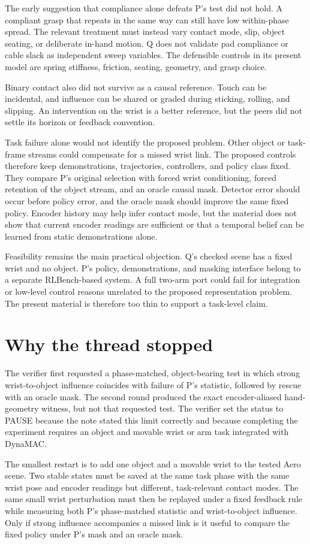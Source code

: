 \documentclass{article}
\begin{document}
The early suggestion that compliance alone defeats P's test did not hold.  A compliant grasp that repeats in the same way can still have low within-phase spread.  The relevant treatment must instead vary contact mode, slip, object seating, or deliberate in-hand motion.  Q does not validate pad compliance or cable slack as independent sweep variables.  The defensible controls in its present model are spring stiffness, friction, seating, geometry, and grasp choice.

Binary contact also did not survive as a causal reference.  Touch can be incidental, and influence can be shared or graded during sticking, rolling, and slipping.  An intervention on the wrist is a better reference, but the peers did not settle its horizon or feedback convention.

Task failure alone would not identify the proposed problem.  Other object or task-frame streams could compensate for a missed wrist link.  The proposed controls therefore keep demonstrations, trajectories, controllers, and policy class fixed.  They compare P's original selection with forced wrist conditioning, forced retention of the object stream, and an oracle causal mask.  Detector error should occur before policy error, and the oracle mask should improve the same fixed policy.  Encoder history may help infer contact mode, but the material does not show that current encoder readings are sufficient or that a temporal belief can be learned from static demonstrations alone.

Feasibility remains the main practical objection.  Q's checked scene has a fixed wrist and no object.  P's policy, demonstrations, and masking interface belong to a separate RLBench-based system.  A full two-arm port could fail for integration or low-level control reasons unrelated to the proposed representation problem.  The present material is therefore too thin to support a task-level claim.

\section{Why the thread stopped}

The verifier first requested a phase-matched, object-bearing test in which strong wrist-to-object influence coincides with failure of P's statistic, followed by rescue with an oracle mask.  The second round produced the exact encoder-aliased hand-geometry witness, but not that requested test.  The verifier set the status to PAUSE because the note stated this limit correctly and because completing the experiment requires an object and movable wrist or arm task integrated with DynaMAC.

The smallest restart is to add one object and a movable wrist to the tested Aero scene.  Two stable states must be saved at the same task phase with the same wrist pose and encoder readings but different, task-relevant contact modes.  The same small wrist perturbation must then be replayed under a fixed feedback rule while measuring both P's phase-matched statistic and wrist-to-object influence.  Only if strong influence accompanies a missed link is it useful to compare the fixed policy under P's mask and an oracle mask.



\end{document}
